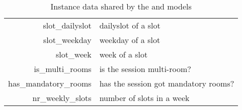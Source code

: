 \begin{table}[!ht]
{\begin{tabular}{|rl|}
slot\_dailyslot         & dailyslot of a slot \\%
slot\_weekday           & weekday of a slot \\%
slot\_week              & week of a slot \\%
\hline
is\_multi\_rooms        & is the session multi-room? \\%
has\_mandatory\_rooms   & has the session got mandatory rooms? \\%
nr\_weekly\_slots       & number of slots in a week \\%
\hline
\end{tabular}
}
\caption{
Instance data shared by the \MINIZINC{} and \CHR{} models
}
\label{table:cp-instance-data}
\end{table}

